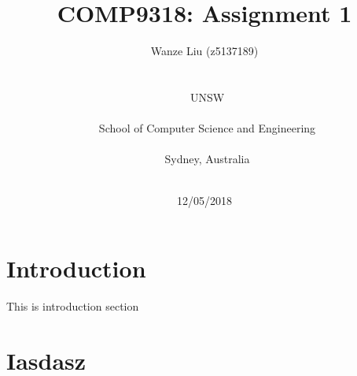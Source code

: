 \documentclass{article}
\title{COMP9318: Assignment 1}
\author{Wanze Liu (z5137189)\\
\date{12/05/2018}\\
\ UNSW\\
\\
\ School of Computer Science and Engineering\\[-0.3ex]
\\
\ Sydney, Australia\\
\\
}
\begin{document}
\maketitle{}

\section{Introduction}

This is introduction section
\section{Iasdasz}
\end{document}

